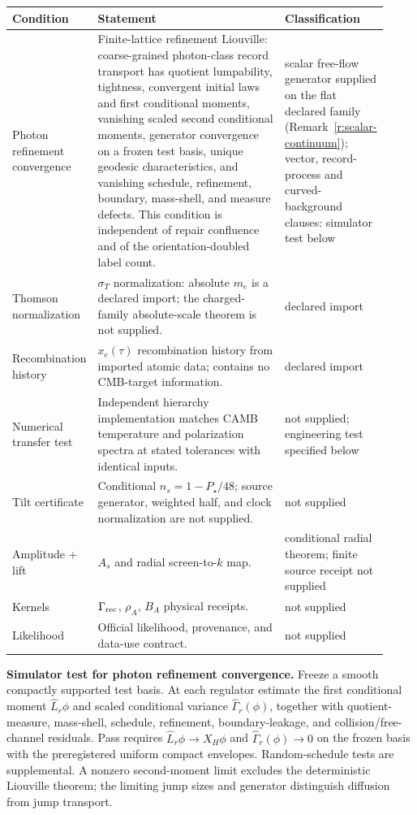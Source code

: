 \documentclass[11pt]{article}
\theoremstyle{remark}
\begin{document}
\begin{longtable}{@{}L{0.16\linewidth}L{0.5\linewidth}L{0.26\linewidth}@{}}
\toprule
\textbf{Condition} & \textbf{Statement} & \textbf{Classification}\\
\midrule
Photon refinement convergence &
Finite-lattice refinement Liouville: coarse-grained photon-class record
transport has quotient lumpability, tightness, convergent initial laws and
first conditional moments, vanishing scaled second conditional moments,
generator convergence on a frozen test basis, unique geodesic characteristics,
and vanishing schedule, refinement, boundary, mass-shell, and measure defects.
This condition is independent
of repair confluence and of the orientation-doubled label count. &
scalar free-flow generator supplied on the flat declared family
(Remark~\ref{r:scalar-continuum}); vector, record-process and
curved-background clauses: simulator test below\\
Thomson normalization &
$\sigma_T$ normalization: absolute $m_e$ is a declared import; the
charged-family absolute-scale theorem is not supplied. &
declared import\\
Recombination history &
$x_e(\tau)$ recombination history from imported atomic data; contains no
CMB-target information. &
declared import\\
Numerical transfer test &
Independent hierarchy implementation matches CAMB temperature and polarization spectra at stated
tolerances with identical inputs. &
not supplied; engineering test specified below\\
Tilt certificate &
Conditional \(n_s=1-P_\star/48\); source generator, weighted half, and clock
normalization are not supplied. &
not supplied\\
Amplitude + lift &
$A_s$ and radial screen-to-$k$ map. &
conditional radial theorem; finite source receipt not supplied\\
Kernels &
$\Gamma_{\rm rec}$, $\rho_A$, $B_A$ physical receipts. &
not supplied\\
Likelihood &
Official likelihood, provenance, and data-use contract. &
not supplied\\
\bottomrule
\end{longtable}

\textbf{Simulator test for photon refinement convergence.} Freeze a smooth compactly
supported test basis. At each regulator estimate the first conditional moment
$\widehat L_r\phi$ and scaled conditional variance
$\widehat\Gamma_r(\phi)$, together with quotient-measure, mass-shell,
schedule, refinement, boundary-leakage, and collision/free-channel residuals.
Pass requires $\widehat L_r\phi\to X_H\phi$ and
$\widehat\Gamma_r(\phi)\to0$ on the frozen basis with the preregistered
uniform compact envelopes. Random-schedule tests are supplemental.
A nonzero second-moment limit excludes the deterministic Liouville theorem;
the limiting jump sizes and generator distinguish diffusion from jump transport.
\end{document}
